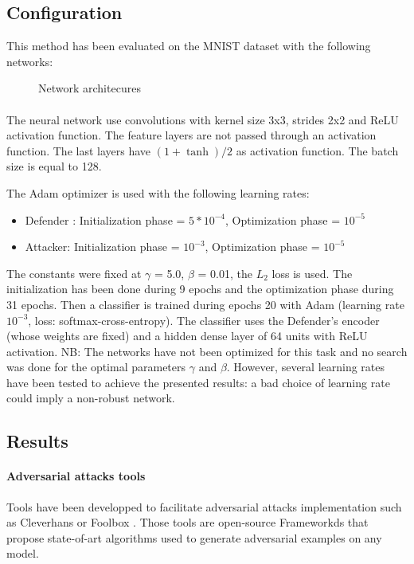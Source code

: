 \documentclass[12pt]{article}
\begin{document}
\subsection{Configuration}
This method has been evaluated on the MNIST dataset with the following networks:

\begin{figure}[H]
\centering
{}
\label{architecture}
\caption{Network architecures}
\end{figure}

\paragraph{}
The neural network use convolutions with kernel size 3x3, strides 2x2 and ReLU activation function. The feature layers are not passed through an activation function. The last layers have $(1+ \tanh)/2$ as activation function. The batch size is equal to 128.

The Adam optimizer is used with the following learning rates:
\begin{itemize}
\item Defender : Initialization phase = $5 * 10^{-4}$, Optimization phase = $10^{-5}$
\item Attacker: Initialization phase = $10^{-3}$, Optimization phase = $10^{-5}$
\end{itemize}

The constants were fixed at $\gamma$ = 5.0, $\beta$ = 0.01, the $L_{2}$ loss is used.
The initialization has been done during 9 epochs and the optimization phase during 31 epochs.
Then a classifier is trained during epochs 20 with Adam (learning rate $10^{-3}$, loss: softmax-cross-entropy). The classifier uses the Defender’s encoder (whose weights are fixed) and a hidden dense layer of 64 units with ReLU activation.
NB: The networks have not been optimized for this task and no search was done for the optimal parameters  $\gamma$ and $\beta$. However, several learning rates have been tested to achieve the presented results: a bad choice of learning rate could imply a non-robust network.

\subsection{Results}
\paragraph{Adversarial attacks tools}
Tools have been developped to facilitate adversarial attacks implementation such as Cleverhans\cite{papernot2018cleverhans} or Foolbox \cite{rauber_foolbox:_2017}. Those tools are open-source Frameworkds that propose state-of-art algorithms used to generate adversarial examples on any model.
\end{document}
